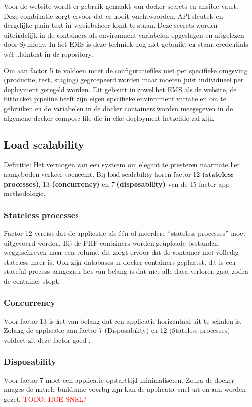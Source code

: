 Voor de website wordt er gebruik gemaakt van docker-secrets en ansible-vault. Deze combinatie zorgt ervoor dat er nooit wachtwoorden, API sleutels en dergelijke plain-text in versiebeheer komt te staan. Deze secrets worden uiteindelijk in de containers als environment variabelen opgeslagen en uitgelezen door Symfony. In het EMS is deze techniek nog niet gebruikt en staan credentials wél plaintext in de repository.

Om aan factor 5 te voldoen moet de configuratiefiles niet per specifieke omgeving (productie, test, staging) gegroepeerd worden maar moeten juist individueel per deployment geregeld worden. Dit gebeurt in zowel het EMS als de website, de bitbucket pipeline heeft zijn eigen specifieke environment variabelen om te gebruiken en de variabelen in de docker containers worden meegegeven in de algemene docker-compose file die in elke deployment hetzelfde zal zijn.

\subsection{Load scalability}
Definitie: Het vermogen van een systeem om elegant te presteren naarmate het aangeboden verkeer toeneemt. Bij load scalability horen factor 12 \textbf{(stateless processes)}, 13 \textbf{(concurrency)} en 7 \textbf{(disposability)} van de 15-factor app methodologie. 

\subsubsection{Stateless processes}
Factor 12 vereist dat de applicatie als één of meerdere \enquote{stateless processes} moet uitgevoerd worden. Bij de PHP containers worden geüploade bestanden weggeschreven naar een volume, dit zorgt ervoor dat de container niet volledig stateless meer is. Ook zijn databases in docker containers geplaatst, dit is een stateful process aangezien het van belang is dat niet alle data verloren gaat zodra de container stopt.

\subsubsection{Concurrency}
Voor factor 13 is het van belang dat een applicatie horizontaal uit te schalen is. Zolang de applicatie aan factor 7 (Disposability) en 12 (Stateless processes) voldoet zit deze factor goed \parencite{Beyond12Factor}.

\subsubsection{Disposability}
Voor factor 7 moet een applicatie opstarttijd minimaliseren. Zodra de docker images de initiële buildtime voorbij zijn kan de applicatie snel uit en aan worden gezet. \textcolor{red}{TODO: HOE SNEL?} %

